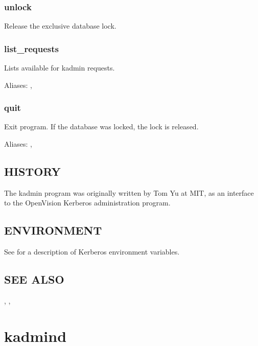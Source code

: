 \documentclass[letterpaper,10pt,english]{sphinxmanual}
\begin{document}
\subsubsection{unlock}
\label{\detokenize{admin/admin_commands/kadmin_local:unlock}}
Release the exclusive database lock.


\subsubsection{list\_requests}
\label{\detokenize{admin/admin_commands/kadmin_local:list-requests}}
Lists available for kadmin requests.

Aliases: , 


\subsubsection{quit}
\label{\detokenize{admin/admin_commands/kadmin_local:quit}}
Exit program.  If the database was locked, the lock is released.

Aliases: , 


\subsection{HISTORY}
\label{\detokenize{admin/admin_commands/kadmin_local:history}}
The kadmin program was originally written by Tom Yu at MIT, as an
interface to the OpenVision Kerberos administration program.


\subsection{ENVIRONMENT}
\label{\detokenize{admin/admin_commands/kadmin_local:environment}}
See  for a description of Kerberos environment
variables.


\subsection{SEE ALSO}
\label{\detokenize{admin/admin_commands/kadmin_local:see-also}}
, {\hyperref[\detokenize{admin/admin_commands/kadmind:kadmind-8}]{}}, 


\section{kadmind}
\label{\detokenize{admin/admin_commands/kadmind:kadmind-8}}\label{\detokenize{admin/admin_commands/kadmind:kadmind}}\label{\detokenize{admin/admin_commands/kadmind::doc}}
\end{document}
